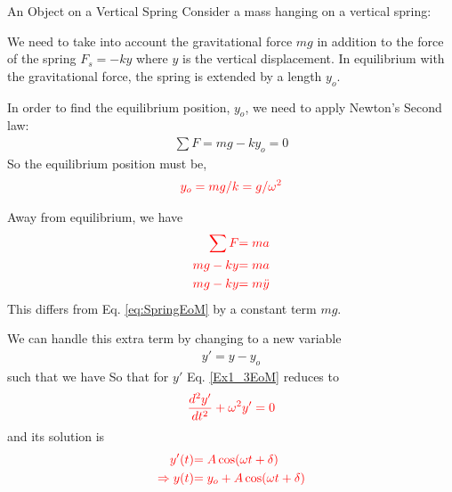 \begin{examplebox}{An Object on a Vertical Spring}
Consider a mass hanging on a vertical spring:

We need to take into account the gravitational force $mg$ in addition to the force of the spring $F_s = -ky$ where $y$ is the vertical displacement. In equilibrium with the gravitational force, the spring is extended by a length $y_o$. 

In order to find the equilibrium position, $y_o$, we need to apply Newton's Second law:
\begin{align}
\sum F = mg - k y_o = 0 
\end{align}
So the equilibrium position must be,
\begin{align}
\textcolor{red}{y_o = mg/k = g/\omega^2}
\end{align}

Away from equilibrium, we have
\begin{align}
\textcolor{red}{\sum F }&\textcolor{red}{= ma} \nonumber \\
\textcolor{red}{mg - ky} &\textcolor{red}{= ma} \nonumber\\
\textcolor{red}{mg - ky} &\textcolor{red}{= m \ddot{y}} \label{Ex1_3EoM}
\end{align}
This differs from Eq. \eqref{eq:SpringEoM} by a constant term $mg$. 

We can handle this extra term by changing to a new variable 
\begin{align}
y' = y - y_o
\end{align}
such that we have 
So that for $y'$ Eq. \eqref{Ex1_3EoM} reduces to
\begin{align}
\textcolor{red}{\frac{d^2 y'}{dt^2} + \omega^2 y' = 0}
\end{align}
and its solution is 
\begin{align}
\textcolor{red}{y'(t)} &\textcolor{red}{= A \cos (\omega t + \delta)} \nonumber \\
\textcolor{red}{\Rightarrow y(t)} &\textcolor{red}{= y_o + A \cos(\omega t + \delta)} 
\end{align}
\end{examplebox}

